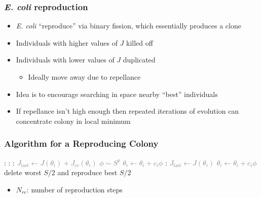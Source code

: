 \documentclass{beamer}
\begin{document}
\begin{frame}
\frametitle{\textit{E. coli} reproduction}
\begin{itemize}
  \item<1-> \textit{E. coli} ``reproduce'' via binary fission, which essentially produces a clone
  \item<2-> Individuals with higher values of $J$ killed off
  \item<3-> Individuals with lower values of $J$ duplicated
  \begin{itemize}
    \item<3-> Ideally move away due to repellance
  \end{itemize}
  \item<4-> Idea is to encourage searching in space nearby ``best'' individuals
  \item<5-> \alert{If repellance isn't high enough then repeated iterations of evolution can concentrate colony in local minimum}
\end{itemize}
\end{frame}

\begin{frame}
\frametitle{Algorithm for a Reproducing Colony}
\begin{algorithmic}[1]
:
  \For {\textcolor{gray}{$j \gets 1 \dots N_c $}}:
    \For {\textcolor{gray}{$i \gets 1 \dots S$}}:
      \State \textcolor{gray}{$J_\text{last} \gets J(\theta_i) + J_{cc}(\theta_i)$}
      \State \textcolor{gray}{$\phi \sim S^p$}
      \State \textcolor{gray}{$\theta_i \gets \theta_i + c_i \phi$}
      :
        \State \textcolor{gray}{$J_\text{last} \gets J(\theta_i)$}
        \State \textcolor{gray}{$\theta_i \gets \theta_i + c_i \phi$}
      \EndWhile
    \EndFor
  \EndFor
  \State delete worst $S/2$ and reproduce best $S/2$
\EndFor
\end{algorithmic}
\begin{itemize}
  \item $N_{re}$: number of reproduction steps
\end{itemize}
\end{frame}
\end{document}
